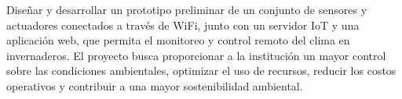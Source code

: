 Diseñar y desarrollar un prototipo preliminar de un conjunto de sensores y
actuadores conectados a través de WiFi, junto con un servidor IoT y
una aplicación web, que permita el monitoreo y control remoto del clima en
invernaderos. El proyecto busca proporcionar a la institución un mayor
control sobre las condiciones ambientales, optimizar el uso de recursos,
reducir los costos operativos y contribuir a una mayor sostenibilidad
ambiental.